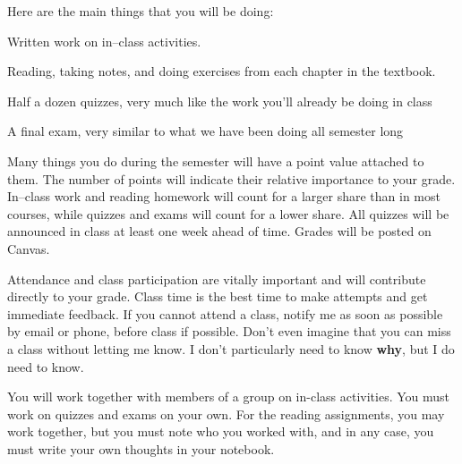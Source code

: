  Here are the main things that you will be doing:
\blist{0.0in}
\item Written work on in--class activities.
\item Reading, taking notes, and doing exercises from each chapter in the textbook.
\item Half a dozen quizzes, very much like the work you'll already be doing in class
\item A final exam, very similar to what we have been doing all semester long
\elist

  Many things you do during the semester will have a point value attached to them.  
The number of points will indicate their relative importance to your grade.  
In--class work and reading homework will count for a larger share than in most courses, while quizzes and exams will count for a lower share.
All quizzes will be announced in class at least one week ahead of time.
Grades will be posted on Canvas.

 Attendance and class participation are vitally important and will contribute directly to your grade.
Class time is the best time to make attempts and get immediate feedback.
If you cannot attend a class, notify me as soon as possible by email or phone, before class if possible.
Don't even imagine that you can miss a class without letting me know.
I don't particularly need to know {\bf why}, but I do need to know.

 You will work together with members of a group on in-class activities.  You must work on quizzes and exams on your own.  For the reading assignments, you may work together, but you must note who you worked with, and in any case, you must write your own thoughts in your notebook.
\vfill          %
